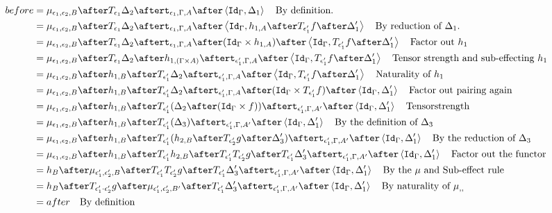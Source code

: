 {            \begin{align}
                before &= \bind{\e_1}{\e_2}{B}\after \T{\e_1}{\D_2}\after\tstrength{\e_1}{\G}{A}\after\pr{\idg}{\D_1}\qt{By definition.}\\
                &= \bind{\e_1}{\e_2}{B}\after \T{\e_1}{\D_2}\after\tstrength{\e_1}{\G}{A}\after\pr{\idg}{h_{1, A}\after\T{\e_1'}{f}\after\D_1'}\qt{By reduction of $\D_1$.}\\
                &= \bind{\e_1}{\e_2}{B}\after \T{\e_1}{\D_2}\after\tstrength{\e_1}{\G}{A}\after(\idg\times h_{1, A})\after\pr{\idg}{\T{\e_1'}{f}\after\D_1'}\qt{Factor out $h_1$}\\
                &= \bind{\e_1}{\e_2}{B}\after \T{\e_1}{\D_2}\after
                h_{1, (\G\times A)}\after
                \tstrength{\e_1'}{\G}{A}\after\pr{\idg}{\T{\e_1'}{f}\after\D_1'}\qt{Tensor strength and sub-effecting $h_1$}\\
                &= \bind{\e_1}{\e_2}{B}\after 
                h_{1, B}\after\T{\e_1'}{\D_2}\after
                \tstrength{\e_1'}{\G}{A}\after\pr{\idg}{\T{\e_1'}{f}\after\D_1'}\qt{Naturality of $h_1$}\\
                &= \bind{\e_1}{\e_2}{B}\after 
                h_{1, B}\after\T{\e_1'}{\D_2}\after
                \tstrength{\e_1'}{\G}{A}\after(\idg\times \T{\e_1'}{f})\after\pr{\idg}{\D_1'}\qt{Factor out pairing again}\\
                &= \bind{\e_1}{\e_2}{B}\after 
                h_{1, B}\after\T{\e_1'}{(\D_2\after(\idg\times f))}\after
                \tstrength{\e_1'}{\G}{A'}\after\pr{\idg}{\D_1'}\qt{Tensorstrength}\\
                &= \bind{\e_1}{\e_2}{B}\after 
                h_{1, B}\after\T{\e_1'}{(\D_3)}\after
                \tstrength{\e_1'}{\G}{A'}\after\pr{\idg}{\D_1'}\qt{By the definition of $\D_3$}\\
                &= \bind{\e_1}{\e_2}{B}\after 
                h_{1, B}\after\T{\e_1'}{(h_{2, B}\after\T{\e_2'}{g}\after \D_3')}\after
                \tstrength{\e_1'}{\G}{A'}\after\pr{\idg}{\D_1'}\qt{By the reduction of $\D_3$}\\
                &= \bind{\e_1}{\e_2}{B}\after 
                h_{1, B}\after\T{\e_1'}{h_{2, B}}\after\T{\e_1'}{\T{\e_2'}{g}}\after \T{\e_1'}{\D_3'}\after
                \tstrength{\e_1'}{\G}{A'}\after\pr{\idg}{\D_1'}\qt{Factor out the functor}\\
                &= h_B\after\bind{\e_1'}{\e_2'}{B}\after\T{\e_1'}{\T{\e_2'}{g}}\after \T{\e_1'}{\D_3'}\after
                \tstrength{\e_1'}{\G}{A'}\after\pr{\idg}{\D_1'}\qt{By the $\mu$ and Sub-effect rule }\\
                & = h_B\after\T{\e_1'\dot\e_2'}{g}\after\bind{\e_1'}{\e_2'}{B'}\after \T{\e_1'}{\D_3'}\after
                \tstrength{\e_1'}{\G}{A'}\after\pr{\idg}{\D_1'}\qt{By naturality of $\bind{}{}{}$ }\\
                & = after \qt{By definition}
            \end{align}

}
